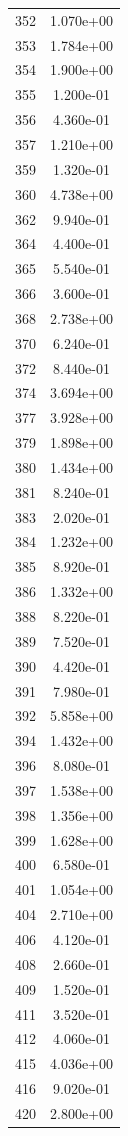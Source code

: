 \documentclass[12pt]{article}
\begin{document}
\begin{longtable}{@{}cc@{}}
352 & 1.070e+00 \\
353 & 1.784e+00 \\
354 & 1.900e+00 \\
355 & 1.200e-01 \\
356 & 4.360e-01 \\
357 & 1.210e+00 \\
359 & 1.320e-01 \\
360 & 4.738e+00 \\
362 & 9.940e-01 \\
364 & 4.400e-01 \\
365 & 5.540e-01 \\
366 & 3.600e-01 \\
368 & 2.738e+00 \\
370 & 6.240e-01 \\
372 & 8.440e-01 \\
374 & 3.694e+00 \\
377 & 3.928e+00 \\
379 & 1.898e+00 \\
380 & 1.434e+00 \\
381 & 8.240e-01 \\
383 & 2.020e-01 \\
384 & 1.232e+00 \\
385 & 8.920e-01 \\
386 & 1.332e+00 \\
388 & 8.220e-01 \\
389 & 7.520e-01 \\
390 & 4.420e-01 \\
391 & 7.980e-01 \\
392 & 5.858e+00 \\
394 & 1.432e+00 \\
396 & 8.080e-01 \\
397 & 1.538e+00 \\
398 & 1.356e+00 \\
399 & 1.628e+00 \\
400 & 6.580e-01 \\
401 & 1.054e+00 \\
404 & 2.710e+00 \\
406 & 4.120e-01 \\
408 & 2.660e-01 \\
409 & 1.520e-01 \\
411 & 3.520e-01 \\
412 & 4.060e-01 \\
415 & 4.036e+00 \\
416 & 9.020e-01 \\
420 & 2.800e+00 \\

\end{longtable}
\end{document}
